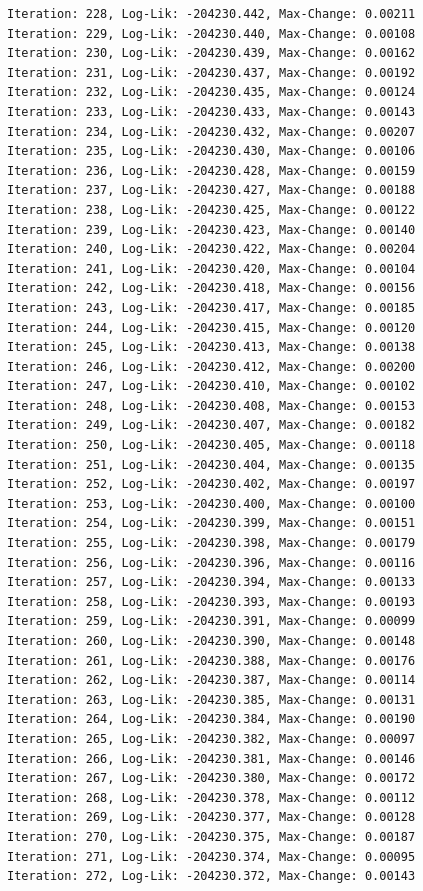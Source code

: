 \documentclass[
  letterpaper,
  DIV=11,
  numbers=noendperiod]{scrreport}
\begin{document}
\begin{verbatim}
Iteration: 228, Log-Lik: -204230.442, Max-Change: 0.00211
Iteration: 229, Log-Lik: -204230.440, Max-Change: 0.00108
Iteration: 230, Log-Lik: -204230.439, Max-Change: 0.00162
Iteration: 231, Log-Lik: -204230.437, Max-Change: 0.00192
Iteration: 232, Log-Lik: -204230.435, Max-Change: 0.00124
Iteration: 233, Log-Lik: -204230.433, Max-Change: 0.00143
Iteration: 234, Log-Lik: -204230.432, Max-Change: 0.00207
Iteration: 235, Log-Lik: -204230.430, Max-Change: 0.00106
Iteration: 236, Log-Lik: -204230.428, Max-Change: 0.00159
Iteration: 237, Log-Lik: -204230.427, Max-Change: 0.00188
Iteration: 238, Log-Lik: -204230.425, Max-Change: 0.00122
Iteration: 239, Log-Lik: -204230.423, Max-Change: 0.00140
Iteration: 240, Log-Lik: -204230.422, Max-Change: 0.00204
Iteration: 241, Log-Lik: -204230.420, Max-Change: 0.00104
Iteration: 242, Log-Lik: -204230.418, Max-Change: 0.00156
Iteration: 243, Log-Lik: -204230.417, Max-Change: 0.00185
Iteration: 244, Log-Lik: -204230.415, Max-Change: 0.00120
Iteration: 245, Log-Lik: -204230.413, Max-Change: 0.00138
Iteration: 246, Log-Lik: -204230.412, Max-Change: 0.00200
Iteration: 247, Log-Lik: -204230.410, Max-Change: 0.00102
Iteration: 248, Log-Lik: -204230.408, Max-Change: 0.00153
Iteration: 249, Log-Lik: -204230.407, Max-Change: 0.00182
Iteration: 250, Log-Lik: -204230.405, Max-Change: 0.00118
Iteration: 251, Log-Lik: -204230.404, Max-Change: 0.00135
Iteration: 252, Log-Lik: -204230.402, Max-Change: 0.00197
Iteration: 253, Log-Lik: -204230.400, Max-Change: 0.00100
Iteration: 254, Log-Lik: -204230.399, Max-Change: 0.00151
Iteration: 255, Log-Lik: -204230.398, Max-Change: 0.00179
Iteration: 256, Log-Lik: -204230.396, Max-Change: 0.00116
Iteration: 257, Log-Lik: -204230.394, Max-Change: 0.00133
Iteration: 258, Log-Lik: -204230.393, Max-Change: 0.00193
Iteration: 259, Log-Lik: -204230.391, Max-Change: 0.00099
Iteration: 260, Log-Lik: -204230.390, Max-Change: 0.00148
Iteration: 261, Log-Lik: -204230.388, Max-Change: 0.00176
Iteration: 262, Log-Lik: -204230.387, Max-Change: 0.00114
Iteration: 263, Log-Lik: -204230.385, Max-Change: 0.00131
Iteration: 264, Log-Lik: -204230.384, Max-Change: 0.00190
Iteration: 265, Log-Lik: -204230.382, Max-Change: 0.00097
Iteration: 266, Log-Lik: -204230.381, Max-Change: 0.00146
Iteration: 267, Log-Lik: -204230.380, Max-Change: 0.00172
Iteration: 268, Log-Lik: -204230.378, Max-Change: 0.00112
Iteration: 269, Log-Lik: -204230.377, Max-Change: 0.00128
Iteration: 270, Log-Lik: -204230.375, Max-Change: 0.00187
Iteration: 271, Log-Lik: -204230.374, Max-Change: 0.00095
Iteration: 272, Log-Lik: -204230.372, Max-Change: 0.00143

\end{verbatim}
\end{document}
